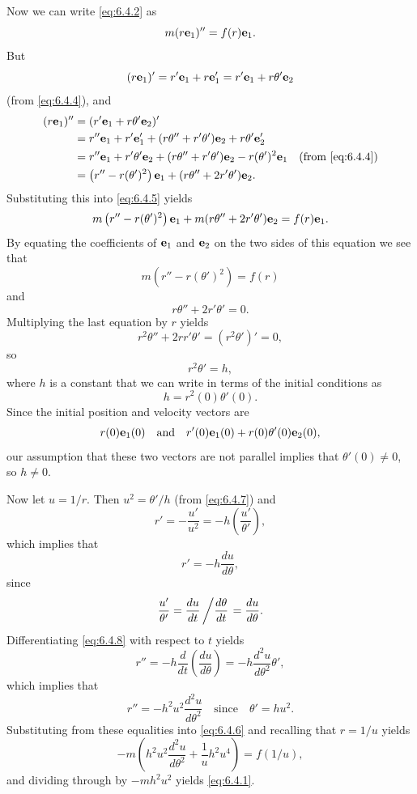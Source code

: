 Now we can write \eqref{eq:6.4.2} as
\begin{equation} \label{eq:6.4.5}
m(r\mathbf{e}_1)''=f(r)\mathbf{e}_1.
\end{equation}
But
\[
(r\mathbf{e}_1)'=r'\mathbf{e}_1+r\mathbf{e}_1'=r'\mathbf{e}_1+r\theta'\mathbf{e}_2
\]
(from \eqref{eq:6.4.4}), and
\begin{align*}
(r\mathbf{e}_1)''&=(r'\mathbf{e}_1+r\theta'\mathbf{e}_2)'\\
&=r''\mathbf{e}_1+r'\mathbf{e}_1'+(r\theta''+r'\theta')\mathbf{e}_2+r\theta'\mathbf{e}_2'\\
&=r''\mathbf{e}_1+r'\theta'\mathbf{e}_2
+(r\theta''+r'\theta')\mathbf{e}_2 -r(\theta')^2\mathbf{e}_1\quad\text{(from \eqref{eq:6.4.4})}\\
&=\left(r''-r(\theta')^2\right)\mathbf{e}_1+(r\theta''+2r'\theta')\mathbf{e}_2.
\end{align*}
Substituting this into \eqref{eq:6.4.5} yields
\[
m\left(r''-r(\theta')^2\right)\mathbf{e}_1+m(r\theta''+2r'\theta')\mathbf{e}_2=f(r)\mathbf{e}_1.
\]
By equating the coefficients of $\mathbf{e}_1$ and $\mathbf{e}_2$ on the
two sides of this equation we see that
\begin{equation} \label{eq:6.4.6}
m\left(r''-r(\theta')^2\right)=f(r)
\end{equation}
and
\[
r\theta''+2r'\theta'=0.
\]
Multiplying the last equation by $r$ yields
\[
r^2\theta''+2rr'\theta'=(r^2\theta')'=0,
\]
so
\begin{equation} \label{eq:6.4.7}
r^2\theta'=h,
\end{equation}
where $h$ is a constant that we can write in terms of the initial
conditions as
\[
h=r^2(0)\theta'(0).
\]
Since the initial position and velocity vectors are
\[
 r(0)\mathbf{e}_1(0)\quad\text{and}\quad 
r'(0)\mathbf{e}_1(0)+r(0)\theta'(0)\mathbf{e}_2(0),
\]
our assumption that these two vectors are not parallel implies that
$\theta'(0)\ne0$, so $h\ne0$.


Now let $u=1/r$.
Then  $u^2=\theta'/h$ (from \eqref{eq:6.4.7}) and
\[
r'=-\dfrac{u'}{u^2}=-h\left(\frac{u'}{\theta'}\right),
\]
which implies that
\begin{equation} \label{eq:6.4.8}
r'=-h\frac{du}{d\theta},
\end{equation}
since
\[
\frac{u'}{\theta'}=\frac{du}{dt}\left/\frac{d\theta}{dt}\right.=
\frac{du}{d\theta}.
\]
Differentiating \eqref{eq:6.4.8} with respect to $t$ yields
\[
r''=-h\frac{d}{dt}\left(\frac{du}{d\theta}\right)
=-h\frac{d^2u}{d\theta^2}\theta',
\]
which implies that
\[
r''=-h^2u^2\frac{d^2u}{d\theta^2}
\quad\text{since}\quad\theta'=hu^2.
\]
Substituting from these equalities into
\eqref{eq:6.4.6} and recalling that $r=1/u$ yields
\[
-m\left(h^2u^2\frac{d^2u}{d\theta^2}+\frac{1}{u}h^2u^4\right)
=f(1/u),
\]
and dividing through by $-mh^2u^2$ yields \eqref{eq:6.4.1}.


